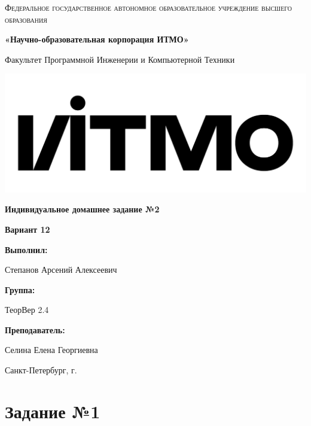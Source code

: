\documentclass[12pt,a4paper]{report}
\begin{document}
\begin{titlepage}
	\centering
	{
		\scshape
		Федеральное государственное автономное образовательное учреждение высшего образования
		\par
		\textbf{«Научно-образовательная корпорация ИТМО»}
		\par
		\vspace*{1cm}
		Факультет Программной Инженерии и Компьютерной Техники
		\par
	}
	\vspace*{0.6cm}
	\includegraphics[width=\textwidth]{logo.png}
	{
		\Large
		\textbf{Индивидуальное домашнее задание №2}
		\par
		\normalsize
		\vspace*{0.75cm}
		\textbf{Вариант 12}
		\par
	}
	\vfill
	\hfill\begin{minipage}{\dimexpr\textwidth-7.8cm}
		\textbf{Выполнил:}\par
		Степанов Арсений Алексеевич\par
		\vspace*{0.15cm}
		\textbf{Группа:}\par
		ТеорВер 2.4\par
		\vspace*{0.15cm}
		\textbf{Преподаватель:}\par
		Селина Елена Георгиевна\par
	\end{minipage}
	\vfill
	Санкт-Петербург, \the\year{}г.
\end{titlepage}
\section*{Задание №1}
\end{document}
